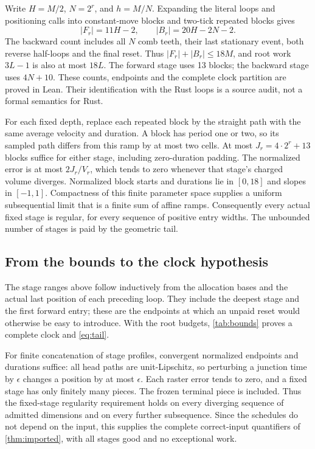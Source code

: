 Write $H=M/2$, $N=2^r$, and $h=M/N$. Expanding the literal loops and
positioning calls into constant-move blocks and two-tick repeated blocks
gives
\[
 |F_r|=11H-2,\qquad |B_r|=20H-2N-2.
\]
The backward count includes all $N$ comb teeth, their last stationary
event, both reverse half-loops and the final reset. Thus
$|F_r|+|B_r|\le18M$, and root work $3L-1$ is also at most $18L$.
The forward stage uses 13 blocks; the backward stage uses $4N+10$.
These counts, endpoints and the complete clock partition are proved in
Lean. Their identification with the Rust loops is a source audit, not a
formal semantics for Rust.

For each fixed depth, replace each repeated block by the straight path
with the same average velocity and duration. A block has period one or
two, so its sampled path differs from this ramp by at most two cells.
At most $J_r=4\cdot2^r+13$ blocks suffice for either stage, including
zero-duration padding. The normalized error is at most $2J_r/V_r$,
which tends to zero whenever that stage's charged volume diverges.
Normalized block starts and durations lie in $[0,18]$ and slopes in
$[-1,1]$. Compactness of this finite parameter space supplies a uniform
subsequential limit that is a finite sum of affine ramps.
Consequently every actual fixed stage is regular, for every sequence of
positive entry widths. The unbounded number of stages is paid by
the geometric tail.

\subsection{From the bounds to the clock hypothesis}

The stage ranges above follow inductively from the allocation bases and
the actual last position of each preceding loop. They include the deepest
stage and the first forward entry; these are the endpoints at which an
unpaid reset would otherwise be easy to introduce. With the root budgets,
\cref{tab:bounds} proves a complete clock and \eqref{eq:tail}.

For finite concatenation of stage profiles, convergent normalized endpoints
and durations suffice: all head paths are unit-Lipschitz, so perturbing a
junction time by $\epsilon$ changes a position by at most $\epsilon$.
Each raster error tends to zero, and a fixed stage has only finitely many
pieces. The frozen terminal piece is included. Thus the fixed-stage
regularity requirement holds on every diverging sequence of admitted
dimensions and on every further subsequence. Since the schedules do not depend on the input,
this supplies the complete correct-input quantifiers of
\cref{thm:imported}, with all stages good and no exceptional work.
